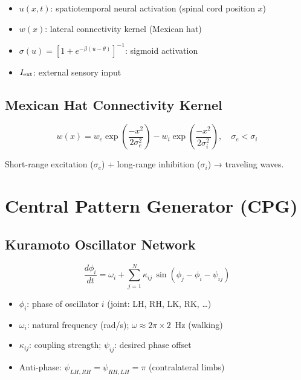 \documentclass[12pt, a4paper]{article}
\begin{document}
\begin{itemize}
  \item $u(x,t)$: spatiotemporal neural activation (spinal cord position $x$)
  \item $w(x)$: lateral connectivity kernel (Mexican hat)
  \item $\sigma(u) = [1 + e^{-\beta(u-\theta)}]^{-1}$: sigmoid activation
  \item $I_{\rm ext}$: external sensory input
\end{itemize}

\subsection{Mexican Hat Connectivity Kernel}

\begin{equation}\label{eq:mexican_hat}
  w(x) = w_e \exp\!\left(\frac{-x^2}{2\sigma_e^2}\right)
         - w_i \exp\!\left(\frac{-x^2}{2\sigma_i^2}\right),
  \quad \sigma_e < \sigma_i
\end{equation}

Short-range excitation ($\sigma_e$) + long-range inhibition ($\sigma_i$) → traveling waves.

\section{Central Pattern Generator (CPG)}

\subsection{Kuramoto Oscillator Network}

\begin{equation}\label{eq:kuramoto}
  \frac{d\phi_i}{dt}
  = \omega_i
    + \sum_{j=1}^{N} \kappa_{ij}\,\sin(\phi_j - \phi_i - \psi_{ij})
\end{equation}

\begin{itemize}
  \item $\phi_i$: phase of oscillator $i$ (joint: LH, RH, LK, RK, \ldots)
  \item $\omega_i$: natural frequency (rad/s); $\omega \approx 2\pi \times 2$~Hz (walking)
  \item $\kappa_{ij}$: coupling strength; $\psi_{ij}$: desired phase offset
  \item Anti-phase: $\psi_{LH,RH} = \psi_{RH,LH} = \pi$ (contralateral limbs)
\end{itemize}
\end{document}
